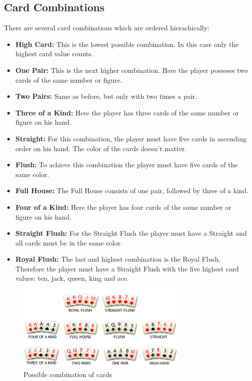 \documentclass[12pt,fleqn,a4paper]{article}
\begin{document}
\subsection{Card Combinations}
There are several card combinations which are ordered hierachically:
\begin{itemize}
	\item \textbf{High Card:} This is the lowest possible combination. In this case only the highest card value counts.
	\item \textbf{One Pair:} This is the next higher combination. Here the player posseses two cards of the same number or figure.
	\item \textbf{Two Pairs:} Same as before, but only with two times a pair.
	\item \textbf{Three of a Kind:} Here the player has three cards of the same number or figure on his hand.
	\item \textbf{Straight:} For this combination, the player must have five cards in ascending order on his hand. The color of the cards doesn't matter. 
	\item \textbf{Flush:} To achieve this combination the player must have five cards of the same color.
	\item \textbf{Full House:} The Full House consists of one pair, followed by three of a kind.
	\item \textbf{Four of a Kind:} Here the player has four cards of the same number or figure on his hand.
	\item \textbf{Straight Flush:} For the Straight Flush the player must have a Straight and all cards must be in the same color.
	\item \textbf{Royal Flush:} The last and highest combination is the Royal Flush. Therefore the player must have a Straight Flush with the five highest card values: ten, jack, queen, king and ace. 
\end{itemize}
	\begin{figure}[!h]
		\begin{center}
			\includegraphics{combinations.png}
			\caption{Possible combination of cards}
		\end{center}
	\end{figure}
	
\end{document}
